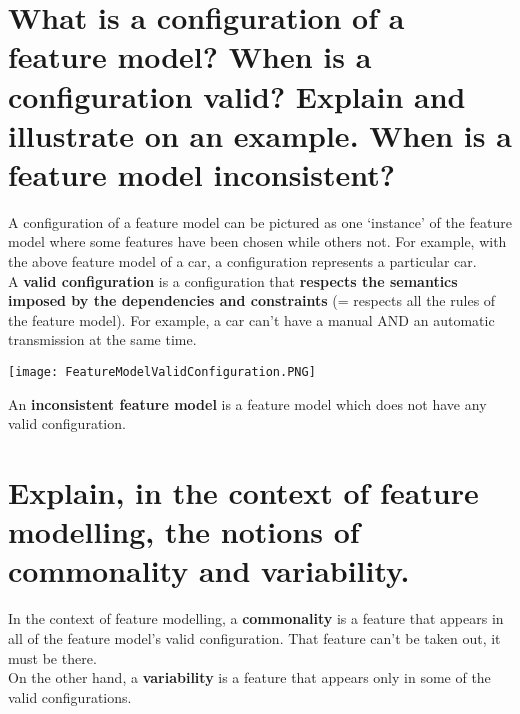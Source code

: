 \section{What is a configuration of a feature model? When is a configuration valid?
Explain and illustrate on an example. When is a feature model inconsistent?}

A configuration of a feature model can be pictured as one ‘instance’ of the feature model where some features have been chosen while others not. For example, with the above feature model of a car, a configuration represents a particular car.\\

A \textbf{valid configuration} is a configuration that \textbf{respects the semantics imposed by the dependencies and constraints} (= respects all the rules of the feature model). For example, a car can’t have a manual AND an automatic transmission at the same time.\\
\begin{center}
\texttt{[image: FeatureModelValidConfiguration.PNG]}
\end{center}
An \textbf{inconsistent feature model} is a feature model which does not have any valid configuration.


\section{Explain, in the context of feature modelling, the notions of commonality and variability.}

In the context of feature modelling, a \textbf{commonality} is a feature that appears in all of the feature model’s valid configuration. That feature can’t be taken out, it must be there. \\
On the other hand, a \textbf{variability} is a feature that appears only in some of the valid configurations. 
